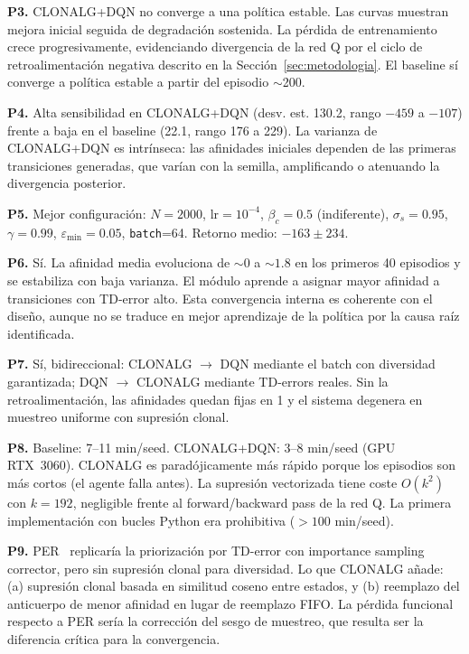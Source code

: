 \documentclass[12pt,a4paper]{article}
\begin{document}
\textbf{P3.} CLONALG+DQN no converge a una política estable. Las curvas
muestran mejora inicial seguida de degradación sostenida. La pérdida de
entrenamiento crece progresivamente, evidenciando divergencia de la red Q
por el ciclo de retroalimentación negativa descrito en la
Sección~\ref{sec:metodologia}. El baseline sí converge a política estable
a partir del episodio $\sim$200.
 
\textbf{P4.} Alta sensibilidad en CLONALG+DQN (desv. est. 130.2, rango
$-459$ a $-107$) frente a baja en el baseline (22.1, rango 176 a 229). La
varianza de CLONALG+DQN es intrínseca: las afinidades iniciales dependen de
las primeras transiciones generadas, que varían con la semilla, amplificando
o atenuando la divergencia posterior.
 
\textbf{P5.} Mejor configuración: $N=2000$, $\text{lr}=10^{-4}$,
$\beta_c=0.5$ (indiferente), $\sigma_s=0.95$, $\gamma=0.99$,
$\varepsilon_{\min}=0.05$, \texttt{batch}=64. Retorno medio: $-163 \pm 234$.
 
\textbf{P6.} Sí. La afinidad media evoluciona de $\sim 0$ a $\sim 1.8$ en
los primeros 40 episodios y se estabiliza con baja varianza. El módulo
aprende a asignar mayor afinidad a transiciones con TD-error alto. Esta
convergencia interna es coherente con el diseño, aunque no se traduce en
mejor aprendizaje de la política por la causa raíz identificada.
 
\textbf{P7.} Sí, bidireccional: CLONALG $\to$ DQN mediante el batch con
diversidad garantizada; DQN $\to$ CLONALG mediante TD-errors reales. Sin la
retroalimentación, las afinidades quedan fijas en 1 y el sistema degenera
en muestreo uniforme con supresión clonal.
 
\textbf{P8.} Baseline: 7--11 min/seed. CLONALG+DQN: 3--8 min/seed (GPU
RTX~3060). CLONALG es paradójicamente más rápido porque los episodios son
más cortos (el agente falla antes). La supresión vectorizada tiene coste
$O(k^2)$ con $k=192$, negligible frente al forward/backward pass de la red
Q. La primera implementación con bucles Python era prohibitiva ($>100$
min/seed).
 
\textbf{P9.} PER~\cite{schaul2015per} replicaría la priorización por
TD-error con importance sampling corrector, pero sin supresión clonal para
diversidad. Lo que CLONALG añade: (a) supresión clonal basada en similitud
coseno entre estados, y (b) reemplazo del anticuerpo de menor afinidad en
lugar de reemplazo FIFO. La pérdida funcional respecto a PER sería la
corrección del sesgo de muestreo, que resulta ser la diferencia crítica
para la convergencia.
 
\end{document}

